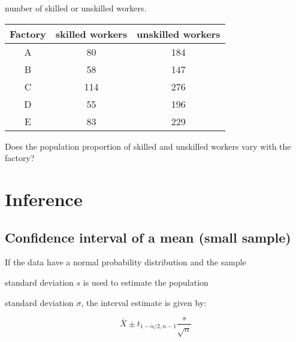 number of skilled or unskilled workers.

 



\begin{tabular}{|c|c|c|}

  \hline


  Factory & skilled workers & unskilled workers \\ \hline

  A & 80 & 184 \\

  B & 58 & 147 \\

  C & 114 & 276 \\

  D & 55 & 196 \\

  E & 83 & 229 \\

  \hline

\end{tabular}

 

Does the population proportion of skilled and unskilled workers vary with the factory?

 


 

\section{Inference}

 

\subsection{Confidence interval of a mean (small sample)}

 

If the data have a normal probability distribution and the sample

standard deviation $s$ is used to estimate the population

standard deviation $\sigma$, the interval estimate is given by:

\begin{equation}

\bar{X} \pm t_{1-\alpha/2,n-1}\frac{s}{\sqrt{n}}

\end{equation}

